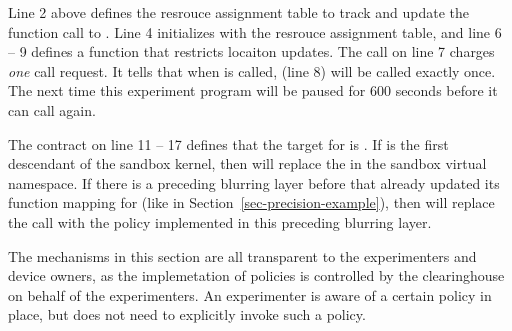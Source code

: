 Line 2 above defines the resrouce assignment table to track and update 
the function call to . Line 4 initializes  
with the resrouce assignment table, and line 6 -- 9 defines a 
function  that restricts locaiton updates. 
The  call on line 7 charges \textit{one}  call 
request. It tells  that when  
is called,  (line 8) will be called exactly once. The
next time this experiment program 
will be paused for 600 seconds before it can call  again.

The contract on line 11 -- 17 defines that the target
for  is . If 
 is the first descendant of the sandbox kernel, then
 will replace the 
in the sandbox virtual namespace. If there is a preceding blurring layer 
before  that already updated its 
function mapping for  (like   
in Section~\ref{sec-precision-example}), then
 will replace the  call
with the policy implemented in this preceding blurring layer.

\smallskip
The mechanisms in this section are all transparent to the experimenters 
and device owners, as the implemetation of policies is controlled by the 
clearinghouse on behalf of the experimenters. An experimenter is aware 
of a certain policy in place, but does not need to explicitly invoke such a 
policy. 